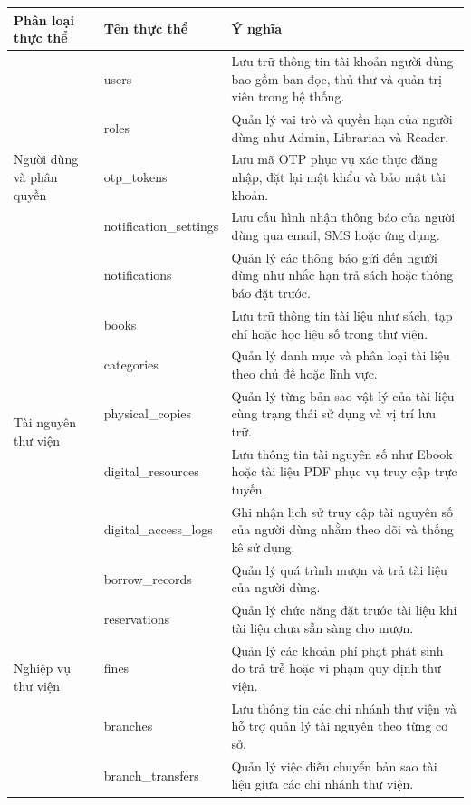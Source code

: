 \begin{table}[H]
\centering
\begin{tabular}{|p{4cm}|p{4cm}|p{7cm}|}
\hline
\textbf{Phân loại thực thể} & \textbf{Tên thực thể} & \textbf{Ý nghĩa} \\ \hline

\multirow{5}{*}{Người dùng và phân quyền} 
& users & Lưu trữ thông tin tài khoản người dùng bao gồm bạn đọc, thủ thư và quản trị viên trong hệ thống. \\ \cline{2-3}
& roles & Quản lý vai trò và quyền hạn của người dùng như Admin, Librarian và Reader. \\ \cline{2-3}
& otp\_tokens & Lưu mã OTP phục vụ xác thực đăng nhập, đặt lại mật khẩu và bảo mật tài khoản. \\ \cline{2-3}
& notification\_settings & Lưu cấu hình nhận thông báo của người dùng qua email, SMS hoặc ứng dụng. \\ \cline{2-3}
& notifications & Quản lý các thông báo gửi đến người dùng như nhắc hạn trả sách hoặc thông báo đặt trước. \\ \hline

\multirow{5}{*}{Tài nguyên thư viện}
& books & Lưu trữ thông tin tài liệu như sách, tạp chí hoặc học liệu số trong thư viện. \\ \cline{2-3}
& categories & Quản lý danh mục và phân loại tài liệu theo chủ đề hoặc lĩnh vực. \\ \cline{2-3}
& physical\_copies & Quản lý từng bản sao vật lý của tài liệu cùng trạng thái sử dụng và vị trí lưu trữ. \\ \cline{2-3}
& digital\_resources & Lưu thông tin tài nguyên số như Ebook hoặc tài liệu PDF phục vụ truy cập trực tuyến. \\ \cline{2-3}
& digital\_access\_logs & Ghi nhận lịch sử truy cập tài nguyên số của người dùng nhằm theo dõi và thống kê sử dụng. \\ \hline

\multirow{5}{*}{Nghiệp vụ thư viện}
& borrow\_records & Quản lý quá trình mượn và trả tài liệu của người dùng. \\ \cline{2-3}
& reservations & Quản lý chức năng đặt trước tài liệu khi tài liệu chưa sẵn sàng cho mượn. \\ \cline{2-3}
& fines & Quản lý các khoản phí phạt phát sinh do trả trễ hoặc vi phạm quy định thư viện. \\ \cline{2-3}
& branches & Lưu thông tin các chi nhánh thư viện và hỗ trợ quản lý tài nguyên theo từng cơ sở. \\ \cline{2-3}
& branch\_transfers & Quản lý việc điều chuyển bản sao tài liệu giữa các chi nhánh thư viện. \\ \hline


\end{tabular}
\end{table}
